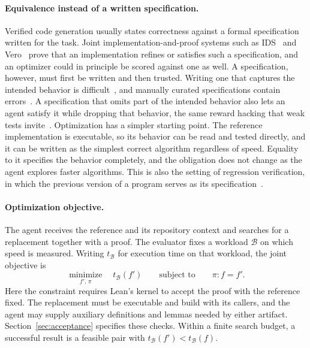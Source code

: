 \documentclass{article}
\begin{document}
\paragraph{Equivalence instead of a written specification.}
Verified code generation usually states correctness against a formal specification written for the task.
Joint implementation-and-proof systems such as IDS~\citep{agarwal2026inductive} and Vero~\citep{ye2026vero} prove that an implementation refines or satisfies such a specification, and an optimizer could in principle be scored against one as well.
A specification, however, must first be written and then trusted.
Writing one that captures the intended behavior is difficult~\citep{endres2024can,ye2026intent,ma2025specgen}, and manually curated specifications contain errors~\citep{ye2026vero}.
A specification that omits part of the intended behavior also lets an agent satisfy it while dropping that behavior, the same reward hacking that weak tests invite~\citep{skalse2022defining}.
Optimization has a simpler starting point.
The reference implementation is executable, so its behavior can be read and tested directly, and it can be written as the simplest correct algorithm regardless of speed.
Equality to it specifies the behavior completely, and the obligation does not change as the agent explores faster algorithms.
This is also the setting of regression verification, in which the previous version of a program serves as its specification~\citep{godlin2013regression}.

\paragraph{Optimization objective.}
The agent receives the reference and its repository context and searches for a replacement together with a proof.
The evaluator fixes a workload $\mathcal{B}$ on which speed is measured.
Writing $t_{\mathcal{B}}$ for execution time on that workload, the joint objective is
\begin{equation}
\underset{f',\,\pi}{\operatorname{minimize}}\quad t_{\mathcal{B}}(f')
\qquad\text{subject to}\qquad \pi : f = f'.
\label{eq:task}
\end{equation}
Here the constraint requires Lean's kernel to accept the proof with the reference fixed.
The replacement must be executable and build with its callers, and the agent may supply auxiliary definitions and lemmas needed by either artifact.
Section~\ref{sec:acceptance} specifies these checks.
Within a finite search budget, a successful result is a feasible pair with $t_{\mathcal{B}}(f') < t_{\mathcal{B}}(f)$.
\end{document}
